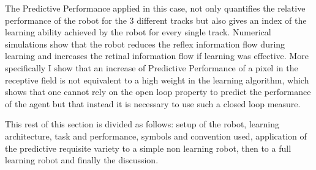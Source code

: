 The Predictive Performance applied in this case, not only quantifies
the relative performance of the robot for the 3 different tracks but
also gives an index of the learning ability achieved by the robot
for every single track. Numerical simulations show that the robot
reduces the reflex information flow during learning and increases the
retinal information flow if learning was effective. More
specifically I show that an increase of Predictive Performance of
a pixel in the receptive field is not equivalent to a high weight
in the learning algorithm, which shows that one cannot rely on the
open loop property to predict the performance of the agent but
that instead it is necessary to use such a closed loop measure.

This rest of this section is divided as follows: setup of the robot,
learning architecture, task and performance, symbols and convention
used, application of the predictive requisite variety to a simple non
learning robot, then to a full learning robot and finally the discussion.


